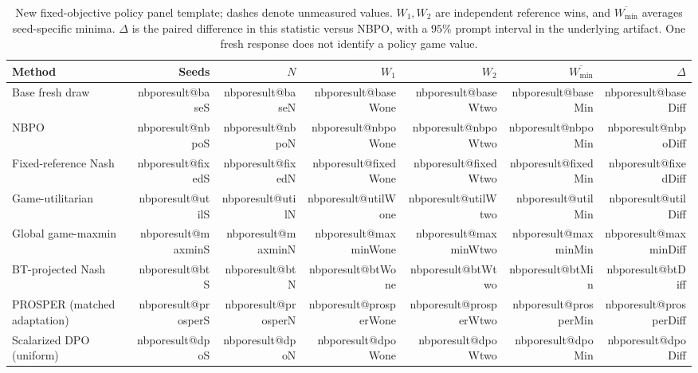 \documentclass{article}
\makeatletter
\theoremstyle{remark}
\theoremstyle{plain}
\newcommand{\nbpocell}[1]{\csname nbporesult@#1\endcsname}
\makeatother
\begin{document}
\begin{table}[H]
\centering\scriptsize\setlength{\tabcolsep}{3pt}
\caption{New fixed-objective policy panel template; dashes denote unmeasured values. $W_1,W_2$ are independent reference wins, and $\overline{W_{\min}}$ averages seed-specific minima. $\Delta$ is the paired difference in this statistic versus NBPO, with a $95\%$ prompt interval in the underlying artifact. One fresh response does not identify a policy game value.}
\label{tab:stress_results}
\begin{tabular}{lrrrrrr}
\toprule
Method & Seeds & $N$ & $W_1$ & $W_2$ & $\overline{W_{\min}}$ & $\Delta$\\
\midrule
Base fresh draw & \nbpocell{baseS} & \nbpocell{baseN} & \nbpocell{baseWone} & \nbpocell{baseWtwo} & \nbpocell{baseMin} & \nbpocell{baseDiff}\\
NBPO & \nbpocell{nbpoS} & \nbpocell{nbpoN} & \nbpocell{nbpoWone} & \nbpocell{nbpoWtwo} & \nbpocell{nbpoMin} & \nbpocell{nbpoDiff}\\
Fixed-reference Nash & \nbpocell{fixedS} & \nbpocell{fixedN} & \nbpocell{fixedWone} & \nbpocell{fixedWtwo} & \nbpocell{fixedMin} & \nbpocell{fixedDiff}\\
Game-utilitarian & \nbpocell{utilS} & \nbpocell{utilN} & \nbpocell{utilWone} & \nbpocell{utilWtwo} & \nbpocell{utilMin} & \nbpocell{utilDiff}\\
Global game-maxmin & \nbpocell{maxminS} & \nbpocell{maxminN} & \nbpocell{maxminWone} & \nbpocell{maxminWtwo} & \nbpocell{maxminMin} & \nbpocell{maxminDiff}\\
BT-projected Nash & \nbpocell{btS} & \nbpocell{btN} & \nbpocell{btWone} & \nbpocell{btWtwo} & \nbpocell{btMin} & \nbpocell{btDiff}\\
PROSPER (matched adaptation) & \nbpocell{prosperS} & \nbpocell{prosperN} & \nbpocell{prosperWone} & \nbpocell{prosperWtwo} & \nbpocell{prosperMin} & \nbpocell{prosperDiff}\\
Scalarized DPO (uniform) & \nbpocell{dpoS} & \nbpocell{dpoN} & \nbpocell{dpoWone} & \nbpocell{dpoWtwo} & \nbpocell{dpoMin} & \nbpocell{dpoDiff}\\
\bottomrule
\end{tabular}
\end{table}
\end{document}
